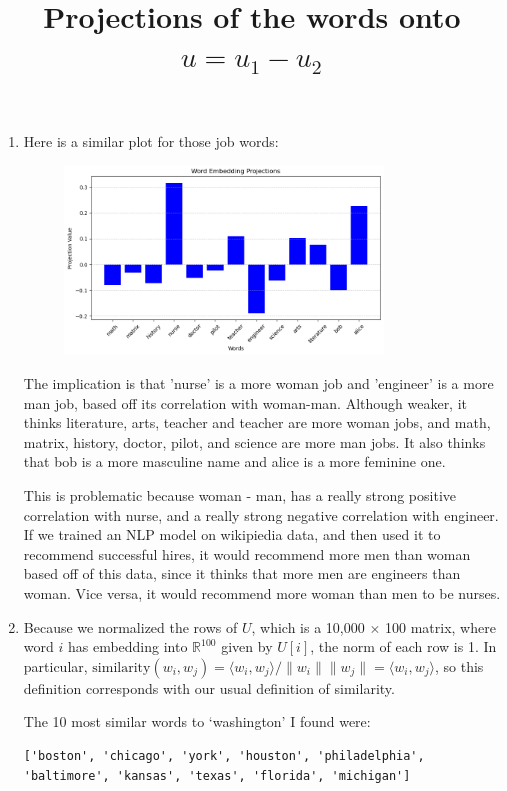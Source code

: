 \documentclass[12pt]{article}
\theoremstyle{definitionstyle}
\def\mbb#1{\mathbb{#1}}
\def \R{\mbb{R}}
\newcommand{\mg}[1]{\| #1 \|}
\renewcommand{\ip}[1]{\langle #1 \rangle}
\begin{document}
\begin{enumerate}[leftmargin=\labelsep]
\begin{enumerate}[label=\textbf{(\alph*)}]
                \item Here is a similar plot for those job words:
                \begin{figure}[H]
                    \centering
                    \includegraphics[width=0.8\textwidth]{job_words.png}
                    \title{Projections of the words onto $u = u_1-u_2$}
                \end{figure}
                 The implication is that 'nurse' is a more woman job and 'engineer' is a more man job, based off its correlation with woman-man. Although weaker, it thinks literature, arts, teacher and teacher are more woman jobs, and math, matrix, history, doctor, pilot, and science are more man jobs. It also thinks that bob is a more masculine name and alice is a more feminine one. 
                
                 This is problematic because woman - man, has a really strong positive correlation with nurse, and a really strong negative correlation with engineer. If we trained an NLP model on wikipiedia data, and then used it to recommend successful hires, it would recommend more men than woman based off of this data, since it thinks that more men are engineers than woman. Vice versa, it would recommend more woman than men to be nurses.

                 \item Because we normalized the rows of $U$, which is a 10,000 $\times$ 100 matrix, where word $i$ has embedding into $\R^{100}$ given by $U[i]$, the norm of each row is 1. In particular, $\text{similarity}(w_i,w_j) = \ip{w_i, w_j} / \mg{w_i}\mg{w_j} = \ip{w_i,w_j}$, so this definition corresponds with our usual definition of similarity.

                 The 10 most similar words to `washington' I found were:
                 \begin{lstlisting}
['boston', 'chicago', 'york', 'houston', 'philadelphia', 'baltimore', 'kansas', 'texas', 'florida', 'michigan']
                 \end{lstlisting}


\end{enumerate}
\end{enumerate}
\end{document}
